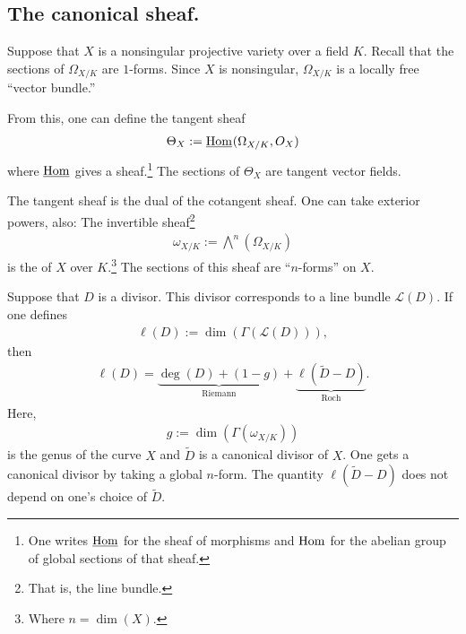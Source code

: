\documentclass [11 pt, oneside] {article}
\begin{document}
\subsection{The canonical sheaf.}
Suppose that $X$ is a nonsingular projective variety over a field $K$.
Recall that the sections of $\Omega_{X/K}$ are $1$-forms.
Since $X$ is nonsingular, $\Omega_{X/K}$ is a locally free ``vector bundle.''

From this, one can define the tangent sheaf 
\begin{align*}
	\Theta_X := \underline{\operatorname{Hom}}_{}(\Omega_{X/K}, \relax{O}_X)
\end{align*}
where $\underline{\operatorname{Hom}}$ gives a sheaf.\footnote{One writes $\underline{\operatorname{Hom}}$ for the sheaf of morphisms and $\operatorname{Hom}$ for the abelian group of global sections of that sheaf.}
The sections of $\Theta_X$ are tangent vector fields.

The tangent sheaf is the dual of the cotangent sheaf. One can take exterior powers, also: The invertible sheaf\footnote{That is, the line bundle.}
\begin{align*}
	\omega_{X/K} := \bigwedge\nolimits^{n} (\Omega_{X/K})
\end{align*}
is the  of $X$ over $K$.\footnote{Where $n=\dim(X)$.} The sections of this sheaf are ``$n$-forms'' on $X$.

\begin{example}\label{}\text{}
Suppose that $D$ is a divisor. This divisor corresponds to a line bundle $\mathscr{L}(D)$.
If one defines
\begin{align*}
	\ell(D) := \dim  (\Gamma(\mathscr{L}(D))),
\end{align*}
then
\begin{align*}
	\ell(D) = \underbrace{\deg(D) +  (1-g)}_{\textrm{Riemann}} + \underbrace{\ell (\tilde D-D)}_{\textrm{Roch}}.
\end{align*}
Here,
\begin{align*}
	g := \dim(\Gamma(\omega_{X/K}))
\end{align*}
is the genus of the curve $X$ and $\tilde D$ is a canonical divisor of $X$. One gets a canonical divisor by taking a global $n$-form. The quantity $\ell(\tilde D-D)$ does not depend on one's choice of $\tilde D$.
\end{example}
\end{document}
